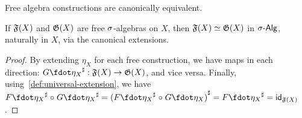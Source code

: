 %
Free algebra constructions are canonically equivalent.
\begin{propositionrep}
    \label{lem:free-algebras-unique}
    If $\mathfrak{F}(X)$ and $\mathfrak{G}(X)$ are free $\sigma$-algebras on $X$,
    then $\mathfrak{F}(X) \mathrel{\simeq} \mathfrak{G}(X)$ in $\sigAlg$, naturally in $X$, via the canonical extensions.
\end{propositionrep}
\begin{proof}
    By extending $\eta_X$ for each free construction,
    we have maps in each direction:
    ${\ext{G\fdot\eta_{X}} : \str{F}(X) \to \str{G}(X)}$, and vice versa.
    Finally, using~\cref{def:universal-extension}, we have
    \(
    {\ext{F\fdot\eta_{X}} \comp \ext{G\fdot\eta_{X}}} =
    {\ext{(\ext{F\fdot\eta_{X}} \comp G\fdot\eta_{X})}} =
    {\ext{F\fdot\eta_{X}}} =
    {\idfunc_{\str{F}(X)}}
    \).
\end{proof}
